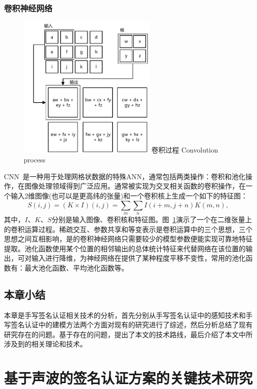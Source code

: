 \subsection{卷积神经网络}
\begin{figure}[!htp]
  \centering
  \includegraphics[width=0.6\textwidth]{figure/convolution-process.pdf}
  \bicaption
    {卷积过程}
    {Convolution process}
  \label{fig:convolution-process}
\end{figure}
CNN~\cite{goodfellow2016deep}是一种用于处理网格状数据的特殊ANN，通常包括两类操作：卷积和池化操作，在图像处理领域得到广泛应用。通常被实现为交叉相关函数的卷积操作，在一个输入2维图像(也可以是更高纬的张量)和一个卷积核上生成一个如下的特征图：
$$
S(i,j)=(K\times I)(i,j)=\sum_{m}\sum_{n}I(i+m,j+n)K(m,n),
$$
其中，$I$、$K$、$S$分别是输入图像、卷积核和特征图。图~\ref{fig:convolution-process}演示了一个在二维张量上的卷积运算过程。稀疏交互、参数共享和等变表示是卷积运算中的三个思想，三个思想之间互相影响，是的卷积神经网络只需要较少的模型参数便能实现可靠地特征提取。池化函数使用某个位置的相邻输出的总体统计特征来代替网络在该位置的输出，可对输入进行降维，为神经网络在提供了某种程度平移不变性，常用的池化函数有：最大池化函数、平均池化函数等。


\section{本章小结}
本章是手写签名认证相关技术的分析，首先分别从手写签名认证中的感知技术和手写签名认证中的建模方法两个方面对现有的研究进行了综述，然后分析总结了现有研究存在的问题。基于存在的问题，提出了本文的技术路线，最后介绍了本文中所涉及到的相关理论和技术。

\chapter{基于声波的签名认证方案的关键技术研究}
